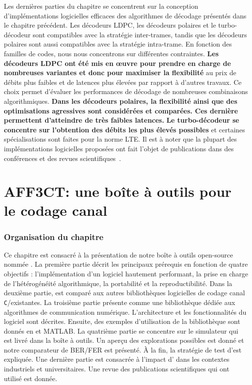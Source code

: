 Les dernières parties du chapitre se concentrent sur la conception
d'implémentations logicielles efficaces des algorithmes de décodage présentés
dans le chapitre précédent. Les décodeurs LDPC, les décodeurs polaires et le
turbo-décodeur sont compatibles avec la stratégie inter-trames, tandis que les
décodeurs polaires sont aussi compatibles avec la stratégie intra-trame. En
fonction des familles de codes, nous nous concentrons sur différentes
contraintes. \textbf{Les décodeurs LDPC ont été mis en œuvre pour prendre en
charge de nombreuses variantes et donc pour maximiser la flexibilité} au prix de
débits plus faibles et de latences plus élevées par rapport à d'autres travaux.
Ce choix permet d'évaluer les performances de décodage de nombreuses
combinaisons algorithmiques. \textbf{Dans les décodeurs polaires, la flexibilité
ainsi que des optimisations agressives sont considérées et comparées. Ces
dernière permettent d'atteindre de très faibles latences.} \textbf{Le
turbo-décodeur se concentre sur l'obtention des débits les plus élevés
possibles} et certaines spécialisations sont faites pour la norme LTE. Il est à
noter que la plupart des implémentations logicielles proposées ont fait l'objet
de publications dans des conférences et des revues
scientifiques~\cite{Ghaffari2019,Leonardon2019,Cassagne2015c,Cassagne2016b,
Cassagne2016a}.

\section*{AFF3CT: une boîte à outils pour le codage canal}

\subsubsection*{Organisation du chapitre}

Ce chapitre est consacré à la présentation de notre boîte à outils open-source
nommée \AFFECT. La première partie décrit les principaux prérequis en fonction
de quatre objectifs : l'implémentation d'un logiciel hautement performant, la
prise en charge de l'hétérogénéité algorithmique, la portabilité et la
reproductibilité. Dans la deuxième partie, \AFFECT est comparé aux autres
bibliothèques logicielles de codage canal \verb|C|/\Cxx existantes. La troisième
partie présente \AFFECT comme une bibliothèque dédiée aux algorithmes de
communication numérique. L'architecture et les fonctionnalités du logiciel sont
décrites. Ensuite, des exemples d'utilisation de la bibliothèque sont donnés en
\Cxx et MATLAB\R. La quatrième partie se concentre sur le simulateur \AFFECT qui
est livré dans la boîte à outils. Un aperçu des explorations possibles est donné
et notre comparateur de BER/FER est présenté. À la fin, la stratégie de test
d'\AFFECT est expliquée. Une dernière partie est consacrée à l'impact d'\AFFECT
dans les contextes industriels et universitaires. Une revue des publications
scientifiques qui ont utilisé \AFFECT est donnée.


